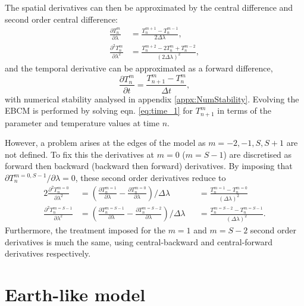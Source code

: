 \documentclass[12pt, onecolumn]{revtex4-2}    %
\newcommand{\partialderiv}[2]{\frac{\partial {#1}}{\partial {#2}}}
\newcommand{\partialderivsecnd}[2]{\frac{\partial^2 {#1}}{\partial {#2}^2}}
\begin{document}
The spatial derivatives can then be approximated by the central difference and second order central difference:
\begin{align}
  \partialderiv{T^m_n}{\lambda}      & = \frac{T^{m+1}_n - T^{m-1}_n}{2 \Delta\lambda},     \label{eq:space_1}        \\
  \partialderivsecnd{T^m_n}{\lambda} & = \frac{T^{m+2}_n -2T^m_n + T^{m-2}_n}{(2 \Delta\lambda)^2},\label{eq:space_2}
\end{align}
and the temporal derivative can be approximated as a forward difference,
\begin{equation} \label{eq:time_1}
  \partialderiv{T^m_n}{t} = \frac{T^m_{n+1} - T^m_n}{\Delta t},
\end{equation}
with numerical stability analysed in appendix \ref{appx:NumStability}.
Evolving the EBCM is performed by solving eqn. \eqref{eq:time_1} for $T^m_{n+1}$ in terms of the parameter and temperature values at time $n$.

However, a problem arises at the edges of the model as $m=-2, -1, S, S+1$ are not defined.
To fix this the derivatives at $m=0$ ($m=S-1$) are discretised as forward then backward (backward then forward) derivatives.
By imposing that ${\partial T^{m=0, S-1}_n}/{\partial \lambda} = 0$, these second order derivatives reduce to
\begin{alignat}{2}
  \partialderivsecnd{T^{m=0}_n}{\lambda}   & = \left(\partialderiv{T^{m=1}_n}{\lambda} - \partialderiv{T^{m=0}_n}{\lambda}\right) / \Delta\lambda     &  & = \frac{T^{m=1}_n - T^{m=0}_n}{(\Delta\lambda)^2}
  \label{eq:forward_backward}                                                                                                                                                                                     \\
  \partialderivsecnd{T^{m=S-1}_n}{\lambda} & = \left(\partialderiv{T^{m=S-1}_n}{\lambda} - \partialderiv{T^{m=S-2}_n}{\lambda}\right) / \Delta\lambda &  & = \frac{T^{m=S-2}_n - T^{m=S-1}_n}{(\Delta\lambda)^2}.
  \label{eq:backward_forward}
\end{alignat}
Furthermore, the treatment imposed for the $m=1$ and $m=S-2$ second order derivatives is much the same, using central-backward and central-forward derivatives respectively.


\section{Earth-like model} \label{sec:EarthLikeModel}
\end{document}
